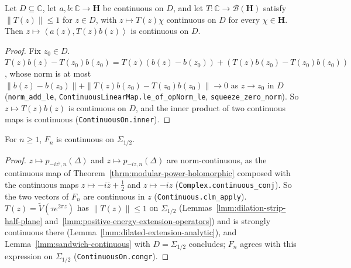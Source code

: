 \begin{lemma}
    \label{lmm:sandwich-continuous}
    \leanok
    Let $D \subseteq \mathbb{C}$, let $a, b : \mathbb{C} \to \mathbf{H}$ be continuous on $D$, and let $T : \mathbb{C} \to \mathcal{B}(\mathbf{H})$ satisfy $\|T(z)\| \le 1$ for $z \in D$, with $z \mapsto T(z)\chi$ continuous on $D$ for every $\chi \in \mathbf{H}$. Then $z \mapsto \left< a(z), T(z)b(z) \right>$ is continuous on $D$.
\end{lemma}
\begin{proof}
    \leanok
    Fix $z_0 \in D$. $T(z)b(z) - T(z_0)b(z_0) = T(z)(b(z) - b(z_0)) + (T(z)b(z_0) - T(z_0)b(z_0))$, whose norm is at most $\|b(z) - b(z_0)\| + \|T(z)b(z_0) - T(z_0)b(z_0)\| \to 0$ as $z \to z_0$ in $D$ (\texttt{norm\_add\_le}, \texttt{ContinuousLinearMap.le\_of\_opNorm\_le}, \texttt{squeeze\_zero\_norm}). So $z \mapsto T(z)b(z)$ is continuous on $D$, and the inner product of two continuous maps is continuous (\texttt{ContinuousOn.inner}).
\end{proof}

\begin{lemma}
    \label{lmm:borchers-approximants-continuous}
    \leanok
    For $n \ge 1$, $F_n$ is continuous on $\Sigma_{1/2}$.
\end{lemma}
\begin{proof}
    \leanok
    $z \mapsto p_{-iz^\flat,n}(\Delta)$ and $z \mapsto p_{-iz,n}(\Delta)$ are norm-continuous, as the continuous map of Theorem~\ref{thrm:modular-power-holomorphic} composed with the continuous maps $z \mapsto -i\overline{z} + \tfrac{1}{2}$ and $z \mapsto -iz$ (\texttt{Complex.continuous\_conj}). So the two vectors of $F_n$ are continuous in $z$ (\texttt{Continuous.clm\_apply}). $T(z) = \widetilde{V}(\tau e^{2\pi z})$ has $\|T(z)\| \le 1$ on $\Sigma_{1/2}$ (Lemmas~\ref{lmm:dilation-strip-half-plane} and~\ref{lmm:positive-energy-extension-operators}) and is strongly continuous there (Lemma~\ref{lmm:dilated-extension-analytic}), and Lemma~\ref{lmm:sandwich-continuous} with $D = \Sigma_{1/2}$ concludes; $F_n$ agrees with this expression on $\Sigma_{1/2}$ (\texttt{ContinuousOn.congr}).
\end{proof}

